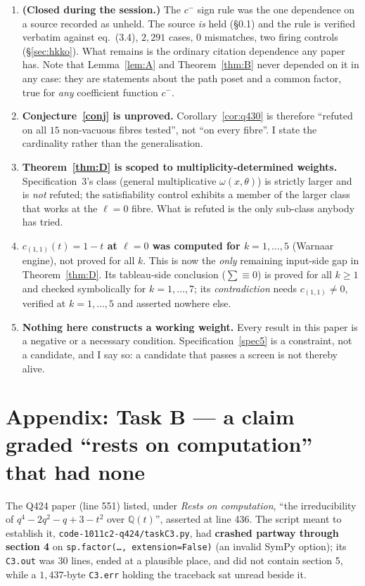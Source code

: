 \documentclass[11pt]{article}
\theoremstyle{plain}
\theoremstyle{definition}
\theoremstyle{remark}
\newcommand{\cm}{c^{-}}
\begin{document}
\begin{enumerate}
\item \textbf{(Closed during the session.)} The $\cm$ sign rule was the one dependence
on a source recorded as unheld. The source \emph{is} held (\S0.1) and the rule is verified
verbatim against eq.\ (3.4), $2{,}291$ cases, $0$ mismatches, two firing controls
(\S\ref{sec:hkko}). What remains is the ordinary citation dependence any paper has. Note
that Lemma~\ref{lem:A} and Theorem~\ref{thm:B} never depended on it in any case: they are
statements about the path poset and a common factor, true for \emph{any} coefficient
function $\cm$.
\item \textbf{Conjecture~\ref{conj} is unproved.} Corollary~\ref{cor:q430} is therefore
``refuted on all $15$ non-vacuous fibres tested'', not ``on every fibre''. I state the
cardinality rather than the generalisation.
\item \textbf{Theorem~\ref{thm:D} is scoped to multiplicity-determined weights.}
Specification~3's class (general multiplicative $\omega(x,\theta)$) is strictly larger and
is \emph{not} refuted; the satisfiability control exhibits a member of the larger class
that works at the $\ell=0$ fibre. What is refuted is the only sub-class anybody has tried.
\item \textbf{$c_{(1,1)}(t)=1-t$ at $\ell=0$ was computed for $k=1,\dots,5$}
(Warnaar engine), not proved for all $k$. This is now the \emph{only} remaining
input-side gap in Theorem~\ref{thm:D}. Its tableau-side conclusion ($\sum\equiv0$) is
proved for all $k\geq1$ and checked symbolically for $k=1,\dots,7$; its
\emph{contradiction} needs $c_{(1,1)}\neq0$, verified at $k=1,\dots,5$ and asserted
nowhere else.
\item \textbf{Nothing here constructs a working weight.} Every result in this paper is a
negative or a necessary condition. Specification~\ref{spec5} is a constraint, not a
candidate, and I say so: a candidate that passes a screen is not thereby alive.
\end{enumerate}

\section{Appendix: Task B --- a claim graded ``rests on computation'' that had none}

The Q424 paper (line 551) listed, under \emph{Rests on computation}, ``the irreducibility of
$q^4-2q^2-q+3-t^2$ over $\mathbb{Q}(t)$'', asserted at line 436. The script meant to
establish it, \texttt{code-1011c2-q424/taskC3.py}, had \textbf{crashed partway through
section 4} on \texttt{sp.factor(\dots, extension=False)} (an invalid SymPy option); its
\texttt{C3.out} was $30$ lines, ended at a plausible place, and did not contain section 5,
while a $1{,}437$-byte \texttt{C3.err} holding the traceback sat unread beside it.
\end{document}
